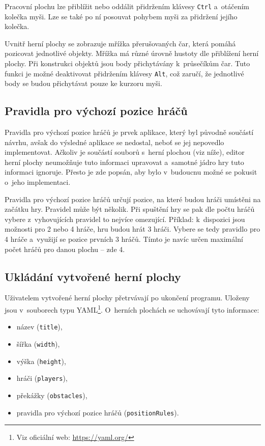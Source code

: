 Pracovní plochu lze přiblížit nebo oddálit přidržením klávesy \texttt{Ctrl} a~otáčením kolečka myši. Lze se také po ní posouvat pohybem myši za přidržení jejího kolečka.

Uvnitř herní plochy se zobrazuje mřížka přerušovaných čar, která pomáhá pozicovat jednotlivé objekty. Mřížka má různé úrovně hustoty dle přiblížení herní plochy. Při konstrukci objektů jsou body přichytávány k~průsečíkům čar. Tuto funkci je možné deaktivovat přidržením klávesy \texttt{Alt}, což zaručí, že jednotlivé body se budou přichytávat pouze ke kurzoru myši.

\subsection*{Pravidla pro výchozí pozice hráčů}

Pravidla pro výchozí pozice hráčů je prvek aplikace, který byl původně součástí návrhu, avšak do výsledné aplikace se nedostal, neboť se jej nepovedlo implementovat. Ačkoliv je součástí souborů s~herní plochou (viz níže), editor herní plochy neumožňuje tuto informaci upravovat a~samotné jádro hry tuto informaci ignoruje. Přesto je zde popsán, aby bylo v~budoucnu možné se pokusit o~jeho implementaci.

Pravidla pro výchozí pozice hráčů určují pozice, na které budou hráči umístěni na začátku hry. Pravidel může být několik. Při spuštění hry se pak dle počtu hráčů vybere z~vyhovujících pravidel to nejvíce omezující. Příklad: k~dispozici jsou možnosti pro 2 nebo 4 hráče, hru budou hrát 3 hráči. Vybere se tedy pravidlo pro 4 hráče a~využijí se pozice prvních 3 hráčů. Tímto je navíc určen maximální počet hráčů pro danou plochu -- zde 4.

\subsection*{Ukládání vytvořené herní plochy}

Uživatelem vytvořené herní plochy přetrvávají po ukončení programu. Uloženy jsou v~souborech typu YAML\footnote{Viz oficiální web: \url{https://yaml.org/}}. O~herních plochách se uchovávají tyto informace:

\begin{itemize}
    \item název (\texttt{title}),
    \item šířka (\texttt{width}),
    \item výška (\texttt{height}),
    \item hráči (\texttt{players}),
    \item překážky (\texttt{obstacles}),
    \item pravidla pro výchozí pozice hráčů (\texttt{positionRules}).
\end{itemize}

